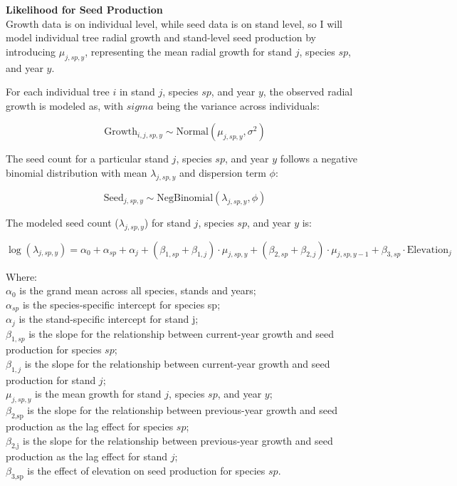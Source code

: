 \documentclass[11pt,letter]{article}
\begin{document}
\textbf{Likelihood for Seed Production}\\
Growth data is on individual level, while seed data is on stand level, so I will model individual tree radial growth and stand-level seed production by introducing \(\mu_{j,sp,y}\), representing the mean radial growth for stand \(j\), species \(sp\), and year \(y\).


For each individual tree \(i\) in stand \(j\), species \(sp\), and year \(y\), the observed radial growth is modeled as, with \(sigma\) being the variance across individuals:

\[
\text{Growth}_{i,j,sp,y} \sim \text{Normal}(\mu_{j,sp,y}, \sigma^2)
\]

The seed count for a particular stand \(j\), species \(sp\), and year \(y\) follows a negative binomial distribution with mean \(\lambda_{j,sp,y}\) and dispersion term \(\phi\):

\[
\text{Seed}_{j,sp,y} \sim \text{NegBinomial}(\lambda_{j,sp,y}, \phi)
\]

The modeled seed count (\(\lambda_{j,sp,y}\)) for stand \(j\), species \(sp\), and year \(y\) is:

\[
\log(\lambda_{j, sp, y}) =\alpha_{0} + \alpha_{sp} + \alpha_{j} + (\beta_{1,sp} + \beta_{1,j}) \cdot \mu_{j,sp,y} + (\beta_{2,sp} + \beta_{2,j}) \cdot \mu_{j,sp,y-1} + \beta_{3,sp} \cdot \text{Elevation}_{j}
\]

Where:\\
\(\alpha_{0}\) is the grand mean across all species, stands and years;\\
\(\alpha_{sp}\) is the species-specific intercept for species sp;\\
\(\alpha_{j}\) is the stand-specific intercept for stand j;\\
\(\beta_{1,sp}\) is the slope for the relationship between current-year growth and seed production for species \(sp\);\\
\(\beta_{1,j}\) is the slope for the relationship between current-year growth and seed production for stand \(j\);\\
\(\mu_{j,sp,y}\) is the mean growth for stand \(j\), species \(sp\), and year \(y\);\\
\(\beta_{\text{2,sp}}\) is the slope for the relationship between previous-year growth and seed production as the lag effect for species \(sp\);\\
\(\beta_{\text{2,j}}\) is the slope for the relationship between previous-year growth and seed production as the lag effect for stand \(j\);\\
\(\beta_{\text{3,sp}}\) is the effect of elevation on seed production for species \(sp\).\\
\end{document}
